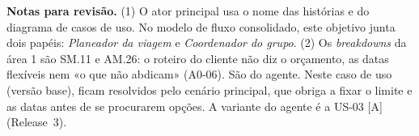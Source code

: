 \documentclass[11pt,a4paper]{article}
\newcommand{\reg}[1]{{\footnotesize\textcolor{pendente}{(#1)}}}
\begin{document}
\medskip
{\footnotesize\textbf{Notas para revisão.}
(1) O ator principal usa o nome das histórias e do diagrama de casos de uso. No modelo de fluxo consolidado, este objetivo junta dois papéis: \textit{Planeador da viagem} e \textit{Coordenador do grupo}.
(2) Os \textit{breakdowns} da área 1 são SM.11 e AM.26: o roteiro do cliente não diz o orçamento, as datas flexíveis nem «o que não abdicam» \reg{A0-06}. São do agente. Neste caso de uso (versão base), ficam resolvidos pelo cenário principal, que obriga a fixar o limite e as datas antes de se procurarem opções. A variante do agente é a US-03 [A] (Release~3).\par}
\end{document}
